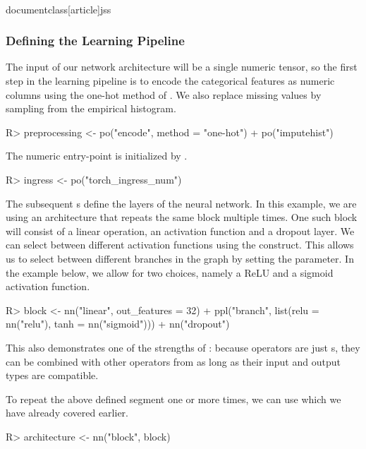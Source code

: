 \\documentclass[article]{jss}
\theoremstyle{definition}
\begin{document}
\subsubsection{Defining the Learning Pipeline}
The input of our network architecture will be a single numeric tensor, so the first step in the learning pipeline is to encode the categorical features as numeric columns using the one-hot method of .
We also replace missing values by sampling from the empirical histogram.

\begin{CodeInput}
R> preprocessing <- po("encode", method = "one-hot") %
+    po("imputehist")
\end{CodeInput}

The numeric entry-point is initialized by .

\begin{CodeInput}
R> ingress <- po("torch_ingress_num")
\end{CodeInput}

The subsequent s define the layers of the neural network.
In this example, we are using an architecture that repeats the same block multiple times.
One such block will consist of a linear operation, an activation function and a dropout layer.
We can select between different activation functions using the  construct.
This allows us to select between different branches in the graph by setting the  parameter.
In the example below, we allow for two choices, namely a ReLU and a sigmoid activation function.

\begin{CodeInput}
R> block <- nn("linear", out_features = 32) %
+    ppl("branch", list(relu = nn("relu"), tanh = nn("sigmoid"))) %
+    nn("dropout")
\end{CodeInput}

This also demonstrates one of the strengths of : because  operators are just s, they can be combined with other operators from  as long as their input and output types are compatible.

To repeat the above defined segment one or more times, we can use  which we have already covered earlier.

\begin{CodeInput}
R> architecture <- nn("block", block)
\end{CodeInput}
\end{document}
